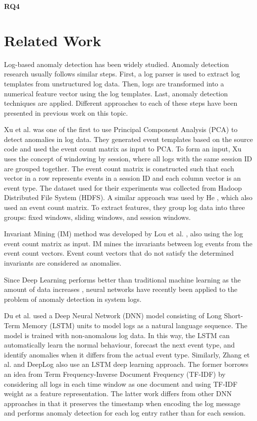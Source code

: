 \textbf{RQ4} \textit{\RQFourth}\\ 
    


\section{Related Work}
Log-based anomaly detection has been widely studied. Anomaly detection research usually follows similar steps. First, a log parser is used to extract log templates from unstructured log data. Then, logs are transformed into a numerical feature vector using the log templates. Last, anomaly detection techniques are applied.
Different approaches to each of these steps have been presented in previous work on this topic. 

Xu et al. \cite{xu2009} was one of the first to use Principal Component Analysis (PCA) to detect anomalies in log data. They generated event templates based on the source code and used the event count matrix as input to PCA. To form an input, Xu uses the concept of windowing by session, where all logs with the same session ID are grouped together. The event count matrix is constructed such that each vector in a row represents events in a session ID and each column vector is an event type. The dataset used for their experiments was collected from Hadoop Distributed File System (HDFS).
A similar approach was used by He \cite{he2016}, which also used an event count matrix. To extract features, they group log data into three groups: fixed windows, sliding windows, and session windows. 

Invariant Mining (IM) method was developed by Lou et al. \cite{lou2010}, also using the log event count matrix as input. IM mines the invariants between log events from the event count vectors. Event count vectors that do not satisfy the determined invariants are considered as anomalies. 

Since Deep Learning performs better than traditional machine learning as the amount of data increases \cite{Sydney2019DeepLF}, neural networks have recently been applied to the problem of anomaly detection in system logs. 

Du et al. \cite{deeplog2017} used a Deep Neural Network (DNN) model consisting of Long Short-Term Memory (LSTM) units to model logs as a natural language sequence. The model is trained with non-anomalous log data. In this way, the LSTM can automatically learn the normal behaviour, forecast the next event type, and identify anomalies when it differs from the actual event type. Similarly, Zhang et al. \cite{zhang2016} and DeepLog \cite{deeplog2017} also use an LSTM deep learning approach. The former borrows an idea from Term Frequency-Inverse Document Frequency (TF-IDF) by considering all logs in each time window as one document and using TF-IDF weight as a feature representation. The latter work differs from other DNN approaches in that it preserves the timestamp when encoding the log message and performs anomaly detection for each log entry rather than for each session.

